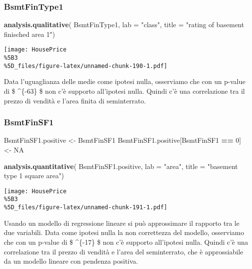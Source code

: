\documentclass[
]{article}
\newenvironment{Shaded}{\begin{snugshade}}{\end{snugshade}}
\newcommand{\AttributeTok}[1]{\textcolor[rgb]{0.13,0.29,0.53}{#1}}
\newcommand{\ConstantTok}[1]{\textcolor[rgb]{0.56,0.35,0.01}{#1}}
\newcommand{\DecValTok}[1]{\textcolor[rgb]{0.00,0.00,0.81}{#1}}
\newcommand{\FunctionTok}[1]{\textcolor[rgb]{0.13,0.29,0.53}{\textbf{#1}}}
\newcommand{\NormalTok}[1]{#1}
\newcommand{\OtherTok}[1]{\textcolor[rgb]{0.56,0.35,0.01}{#1}}
\newcommand{\SpecialCharTok}[1]{\textcolor[rgb]{0.81,0.36,0.00}{\textbf{#1}}}
\newcommand{\StringTok}[1]{\textcolor[rgb]{0.31,0.60,0.02}{#1}}
\begin{document}
\subsubsection{BsmtFinType1}\label{bsmtfintype1-1}

\begin{Shaded}
\begin{Highlighting}[]
\FunctionTok{analysis.qualitative}\NormalTok{(}
\NormalTok{    BsmtFinType1,}
    \AttributeTok{lab =} \StringTok{"class"}\NormalTok{,}
    \AttributeTok{title =} \StringTok{"rating of basement finisched area 1"}\NormalTok{)}
\end{Highlighting}
\end{Shaded}

\texttt{[image: HousePrice\\\%5B3\\\%5D\_files/figure-latex/unnamed-chunk-190-1.pdf]}

Data l'uguaglianza delle medie come ipotesi nulla, osserviamo che con un
p-value di \$ \^{}\{-63\} \$ non c'è supporto all'ipotesi
nulla. Quindi c'è una correlazione tra il prezzo di vendità e l'area
finita di seminterrato.

\subsubsection{BsmtFinSF1}\label{bsmtfinsf1-1}

\begin{Shaded}
\begin{Highlighting}[]
\NormalTok{BsmtFinSF1.positive }\OtherTok{\textless{}{-}}\NormalTok{ BsmtFinSF1}
\NormalTok{BsmtFinSF1.positive[BsmtFinSF1 }\SpecialCharTok{==} \DecValTok{0}\NormalTok{] }\OtherTok{\textless{}{-}} \ConstantTok{NA}

\FunctionTok{analysis.quantitative}\NormalTok{(}
\NormalTok{    BsmtFinSF1.positive,}
    \AttributeTok{lab =} \StringTok{"area"}\NormalTok{,}
    \AttributeTok{title =} \StringTok{"basement type 1 square area"}\NormalTok{)}
\end{Highlighting}
\end{Shaded}

\texttt{[image: HousePrice\\\%5B3\\\%5D\_files/figure-latex/unnamed-chunk-191-1.pdf]}

Usando un modello di regressione lineare si può approssimare il rapporto
tra le due variabili. Data come ipotesi nulla la non correttezza del
modello, osserviamo che con un p-value di \$ \^{}\{-17\} \$
non c'è supporto all'ipotesi nulla. Quindi c'è una correlazione tra il
prezzo di vendità e l'area del seminterrato, che è approssiabile da un
modello lineare con pendenza positiva.
\end{document}
